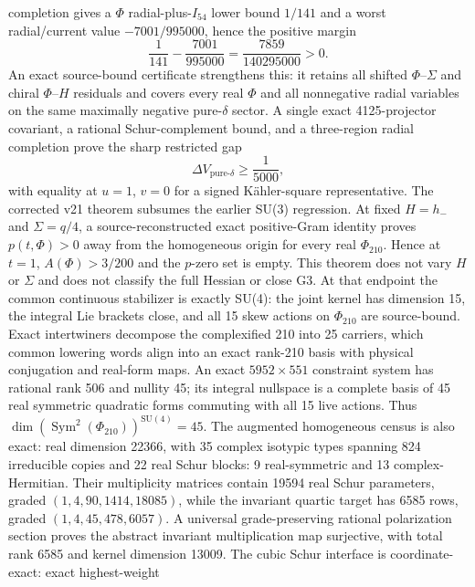 \documentclass[11pt,a4paper]{article}
\begin{document}
  completion gives a $\Phi$ radial-plus-$I_{54}$ lower bound $1/141$ and a worst
  radial/current value $-7001/995000$, hence the positive margin
\begin{equation}
 \frac{1}{141}-\frac{7001}{995000}
 =\frac{7859}{140295000}>0.
\end{equation}
An exact source-bound certificate strengthens this: it retains all shifted
$\Phi$--$\Sigma$ and chiral $\Phi$--$H$ residuals and covers every real $\Phi$
and all nonnegative radial variables on the same
maximally negative pure-$\delta$ sector.  A single exact 4125-projector
covariant, a rational Schur-complement bound, and a three-region radial
completion prove the sharp restricted gap
\begin{equation}
 \Delta V_{\mathrm{pure}\text{-}\delta}\geq \frac{1}{5000},
\end{equation}
with equality at $u=1$, $v=0$ for a signed K\"ahler-square representative.
The corrected v21 theorem subsumes the earlier SU(3) regression. At fixed
$H=h_-$ and $\Sigma=q/4$, a source-reconstructed exact positive-Gram
identity proves $p(t,\Phi)>0$ away from the homogeneous origin for every real $\Phi_{210}$. Hence at
$t=1$, $A(\Phi)>3/200$ and the $p$-zero set is empty. This theorem does not
vary $H$ or $\Sigma$ and does not classify the full Hessian or close G3.
At that endpoint the common continuous stabilizer is exactly SU(4): the joint
kernel has dimension 15, the integral Lie brackets close, and all
15 skew actions on $\Phi_{210}$ are source-bound. Exact intertwiners decompose
the complexified 210 into 25 carriers, which common lowering words
align into an exact rank-210 basis with physical conjugation and real-form
maps. An exact $5952\times551$ constraint system has rational rank 506 and
nullity 45; its integral nullspace is a complete basis
of 45 real symmetric quadratic forms commuting with all 15 live actions.
Thus $\dim\!\left(\operatorname{Sym}^2(\Phi_{210})\right)^{\mathrm{SU}(4)}=45$.
The augmented homogeneous census is also exact: real
dimension 22366, with 35 complex isotypic types spanning 824
irreducible copies and 22 real Schur blocks: 9 real-symmetric and 13
complex-Hermitian.  Their multiplicity matrices contain 19594 real Schur
parameters, graded $(1,4,90,1414,18085)$, while the invariant quartic target
has 6585 rows, graded $(1,4,45,478,6057)$. A universal grade-preserving
rational polarization section proves the abstract invariant multiplication
map surjective, with total rank 6585 and kernel dimension 13009.
The cubic Schur interface is coordinate-exact: exact highest-weight
\end{document}
